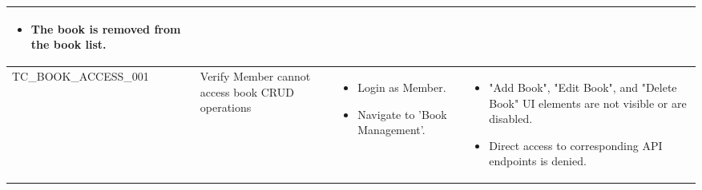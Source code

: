 \begin{longtable}{|>{\scriptsize\raggedright\arraybackslash}p{3.8cm}|>{\raggedright\arraybackslash}p{3.8cm}|>{\raggedright\arraybackslash}p{4cm}|>{\raggedright\arraybackslash}p{4cm}|}
\begin{itemize}[noitemsep, topsep=0pt, partopsep=0pt, leftmargin=*]
        \item The book is removed from the book list.
    \end{itemize} \\ \hline
TC\_BOOK\_ACCESS\_001 & Verify Member cannot access book CRUD operations &
    \begin{itemize}[noitemsep, topsep=0pt, partopsep=0pt, leftmargin=*]
        \item Login as Member.
        \item Navigate to 'Book Management'.
    \end{itemize} &
    \begin{itemize}[noitemsep, topsep=0pt, partopsep=0pt, leftmargin=*]
        \item "Add Book", "Edit Book", and "Delete Book" UI elements are not visible or are disabled.
        \item Direct access to corresponding API endpoints is denied.
    \end{itemize} \\ \hline
    

\end{longtable}
